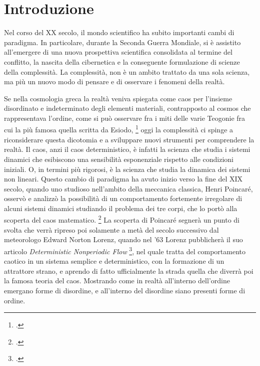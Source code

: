 
\section{Introduzione}
\label{sec:Introduzione}

Nel corso del XX secolo, il mondo scientifico ha subito importanti cambi di paradigma. 
In particolare, durante la Seconda Guerra Mondiale, 
si è assistito all'emergere di una nuova prospettiva scientifica consolidata al termine del conflitto,
la nascita della cibernetica e la conseguente formulazione
di scienze della complessità.
La complessità, non è un ambito trattato da una sola scienza,
ma più un nuovo modo di pensare e di osservare i fenomeni
della realtà. 

Se nella cosmologia greca la realtà veniva spiegata come caos per 
l'insieme disordinato e indeterminato degli elementi materiali, 
contrapposto al cosmos che rappresentava l'ordine, 
come si può osservare fra i miti delle varie Teogonie
fra cui la più famosa quella scritta da Esiodo, \footcite{esiodoteogonia}
oggi la complessità ci spinge a riconsiderare questa dicotomia e a sviluppare 
nuovi strumenti per comprendere la realtà. 
Il caos, anzi il caos deterministico, è infatti la scienza che studia i 
sistemi dinamici che esibiscono una sensibilità esponenziale rispetto alle condizioni iniziali.
O, in termini più rigorosi, è la scienza che studia la dinamica dei sistemi non lineari.
Questo cambio di paradigma ha avuto inizio verso la fine del XIX secolo,
quando uno studioso nell'ambito della meccanica classica, Henri Poincaré,
osservò e analizzò la possibilità di un comportamento fortemente irregolare
di alcuni sistemi dinamici studiando il problema dei tre corpi,
che lo portò alla scoperta del caos matematico. \footcite{poincaréproblema}
La scoperta di Poincaré segnerà un punto di svolta che verrà
ripreso poi solamente a metà del secolo successivo dal meteorologo
Edward Norton Lorenz,
quando nel '63 Lorenz pubblicherà il suo articolo 
\textit{Deterministic Nonperiodic Flow} \footcite{Lorenzdnf},
nel quale tratta del comportamento caotico in un sistema semplice
e deterministico, con la formazione di un attrattore strano,
e aprendo di fatto ufficialmente la strada quella che diverrà poi
la famosa teoria del caos.
Mostrando come in realtà all'interno dell'ordine emergano forme di disordine,
e all'interno del disordine siano presenti forme di ordine. 

